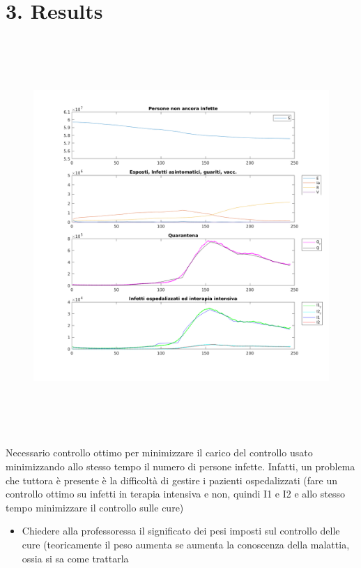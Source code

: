 \documentclass[a4paper]{article}
\begin{document}
\bigskip


\bigskip

\section{3. Results}
\hypertarget{Toc66707030}{}
\bigskip



\begin{figure}
\centering
\includegraphics[width=15.215cm,height=14.995cm]{Optimalcontrolstrategies-img/Optimalcontrolstrategies-img001.png}
\end{figure}

\bigskip


\bigskip

Necessario controllo ottimo per minimizzare il carico del controllo usato minimizzando allo stesso tempo il numero di
persone infette. Infatti, un problema che tuttora è presente è la difficoltà di gestire i pazienti ospedalizzati (fare
un controllo ottimo su infetti in terapia intensiva e non, quindi I1 e I2 e allo stesso tempo minimizzare il controllo
sulle cure) 

\begin{itemize}
\item Chiedere alla professoressa il significato dei pesi imposti sul controllo delle cure (teoricamente il peso aumenta
se aumenta la conoscenza della malattia, ossia si sa come trattarla 
\end{itemize}
\end{document}
